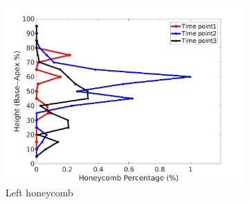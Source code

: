 \begin{figure}[H]
\begin{subfigure}{.42\linewidth}
  \includegraphics[width=\linewidth,trim={{.0\wd0} {.0\wd0} {.0\wd0} {.0\wd0}},clip]{Appendix/Image_AppexA/BaseToApex/IPF21LeftLungHoneycombDiseaseAgainstHeight.jpg} %
  \caption{Left honeycomb}
  \label{fig:IPF21DiseaseAgainstHeight-e} 
\end{subfigure} 
\begin{subfigure}{.42\linewidth}%

\end{subfigure}
\end{figure}
